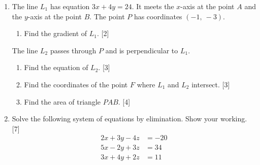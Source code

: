 \documentclass[12pt, twoside]{article}
\begin{document}
\begin{enumerate}[itemsep=0.15cm]

\item[1.] [Maximum mark: 12]

The line $L_{1}$ has equation $3x + 4y = 24$. It meets the $x$-axis at the
point $A$ and the $y$-axis at the point $B$. The point $P$ has coordinates
$(-1,\ -3)$.

\begin{enumerate}[itemsep=0.1cm]
  \item Find the gradient of $L_{1}$. \hfill [2]
\end{enumerate}

The line $L_{2}$ passes through $P$ and is perpendicular to $L_{1}$.

\begin{enumerate}[itemsep=0.1cm]
  \item[(b)] Find the equation of $L_{2}$. \hfill [3]
  \item[(c)] Find the coordinates of the point $F$ where $L_{1}$ and $L_{2}$
  intersect. \hfill [3]
  \item[(d)] Find the area of triangle $PAB$. \hfill [4]
\end{enumerate}


\newpage

\item[2.] [Maximum mark: 7]

Solve the following system of equations by elimination. Show your working.
\hfill [7]
$$\begin{aligned}
2x + 3y - 4z &= -20 \\
5x - 2y + 3z &= 34 \\
3x + 4y + 2z &= 11
\end{aligned}$$



\end{enumerate}
\end{document}
